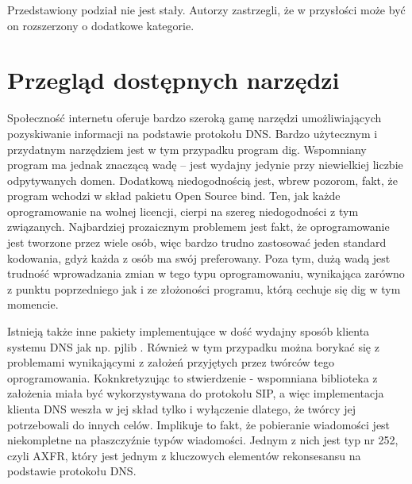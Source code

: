 Przedstawiony podział nie jest stały. Autorzy zastrzegli, że w przysłości może być on rozszerzony o dodatkowe kategorie.



\chapter{Przegląd dostępnych narzędzi}
Społeczność internetu oferuje bardzo szeroką gamę narzędzi umożliwiających pozyskiwanie informacji na podstawie protokołu DNS. Bardzo użytecznym i przydatnym narzędziem jest w tym przypadku program dig. Wspomniany program ma jednak znaczącą wadę -- jest wydajny jedynie przy niewielkiej liczbie odpytywanych domen. Dodatkową niedogodnością jest, wbrew pozorom, fakt, że program wchodzi w skład pakietu Open Source bind. Ten, jak każde oprogramowanie na wolnej licencji, cierpi na szereg niedogodności z tym związanych. Najbardziej prozaicznym problemem jest fakt, że oprogramowanie jest tworzone przez wiele osób, więc bardzo trudno zastosować jeden standard kodowania, gdyż każda z osób ma swój preferowany. Poza tym, dużą wadą jest trudność wprowadzania zmian w tego typu oprogramowaniu, wynikająca zarówno z punktu poprzedniego jak i ze złożoności programu, którą cechuje się dig w tym momencie.

Istnieją także inne pakiety implementujące w dość wydajny sposób klienta systemu DNS jak np. pjlib \cite{pjlib}. Również w tym przypadku można borykać się z problemami wynikającymi z założeń przyjętych przez twórców tego oprogramowania. Koknkretyzując to stwierdzenie - wspomniana biblioteka z założenia miała być wykorzystywana do protokołu SIP, a więc implementacja klienta DNS weszła w jej skład tylko i wyłączenie dlatego, że twórcy jej potrzebowali do innych celów. Implikuje to fakt, że pobieranie wiadomości jest niekompletne na płaszczyźnie typów wiadomości. Jednym z nich jest typ nr 252, czyli AXFR, który jest jednym z kluczowych elementów rekonsesansu na podstawie protokołu DNS.